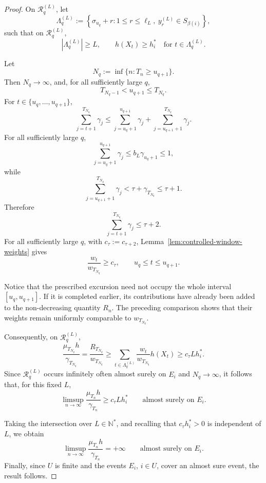 \documentclass[10pt,a4paper]{amsart}
\begin{document}
\begin{proof}
On \(\mathcal R_q^{(L)}\), let
\[
\Lambda_q^{(L)}
:=
\left\{
\sigma_{u_q}+r:
1\leq r\leq\ell_L,\
y_r^{(L)}\in S_{\beta(i)}
\right\},
\]
such that on \(\mathcal R_q^{(L)}\),
\[
|\Lambda_q^{(L)}|\geq L,
\qquad
h(X_t)\geq h_i^*
\quad\text{for }t\in\Lambda_q^{(L)}.
\]

Let
\[
N_q:=\inf\{n:T_n\geq u_{q+1}\}.
\]
Then \(N_q\to\infty\), and, for all sufficiently large \(q\),
\[
T_{N_q-1}<u_{q+1}\leq T_{N_q}.
\]
For \(t\in\{u_q,\ldots,u_{q+1}\}\),
\[
\sum_{j=t+1}^{T_{N_q}}\gamma_j
\leq
\sum_{j=u_q+1}^{u_{q+1}}\gamma_j
+
\sum_{j=u_{q+1}+1}^{T_{N_q}}\gamma_j.
\]
For all sufficiently large \(q\),
\[
\sum_{j=u_q+1}^{u_{q+1}}\gamma_j
\leq
b_L\gamma_{u_q+1}
\leq1,
\]
while
\[
\sum_{j=u_{q+1}+1}^{T_{N_q}}\gamma_j
<
\tau+\gamma_{T_{N_q}}
\leq\tau+1.
\]
Therefore
\[
\sum_{j=t+1}^{T_{N_q}}\gamma_j\leq\tau+2.
\]
For all sufficiently large \(q\), with
\(c_\tau:=c_{\tau+2}\), Lemma~\ref{lem:controlled-window-weights} gives
\[
\frac{w_t}{w_{T_{N_q}}}
\geq
c_\tau,
\qquad
u_q\leq t\leq u_{q+1}.
\]

Notice that the prescribed excursion need not occupy the whole interval \([u_q,u_{q+1}]\). If it is completed earlier, its contributions have already
been added to the non-decreasing quantity \(R_n\). The preceding comparison shows that their weights remain uniformly comparable to
\(w_{T_{N_q}}\).



Consequently, on \(\mathcal R_q^{(L)}\),
\[
\frac{\mu_{T_{N_q}}h}{\gamma_{T_{N_q}}}
=
\frac{R_{T_{N_q}}}{w_{T_{N_q}}}
\geq
\sum_{t\in\Lambda_q^{(L)}}
\frac{w_t}{w_{T_{N_q}}}h(X_t)
\geq
c_\tau Lh_i^*.
\]
Since \(\mathcal R_q^{(L)}\) occurs infinitely often almost surely on \(E_i\)
and \(N_q\to\infty\), it follows that, for this fixed \(L\),
\[
\limsup_{n\to\infty}
\frac{\mu_{T_n}h}{\gamma_{T_n}}
\geq
c_\tau Lh_i^*
\qquad\text{almost surely on }E_i.
\]

Taking the intersection over \(L\in\mathbb N^*\), and recalling that \(c_\tau h_i^*>0\) is independent of \(L\), we obtain
\[
\limsup_{n\to\infty}
\frac{\mu_{T_n}h}{\gamma_{T_n}}
=
+\infty
\qquad\text{almost surely on }E_i.
\]
Finally, since \(U\) is finite and the events \(E_i\), \(i\in U\), cover an almost sure event, the result follows.



\end{proof}
\end{document}
